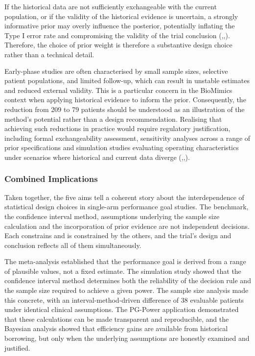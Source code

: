 \documentclass{article}
\begin{document}
If the historical data are not sufficiently exchangeable with the
current population, or if the validity of the historical evidence is
uncertain, a strongly informative prior may overly influence the
posterior, potentially inflating the Type I error rate and compromising
the validity of the trial conclusion
(,,).
Therefore, the choice of prior weight is therefore a substantive design
choice rather than a technical detail.

Early-phase studies are often characterised by small sample sizes,
selective patient populations, and limited follow-up, which can result
in unstable estimates and reduced external validity. This is a
particular concern in the BioMimics context when applying historical
evidence to inform the prior. Consequently, the reduction from 209 to 79
patients should be understood as an illustration of the method's
potential rather than a design recommendation. Realising that achieving
such reductions in practice would require regulatory justification,
including formal exchangeability assessment, sensitivity analyses across
a range of prior specifications and simulation studies evaluating
operating characteristics under scenarios where historical and current
data diverge
(,,).

\subsubsection{Combined Implications}\label{combined-implications}

Taken together, the five aims tell a coherent story about the
interdependence of statistical design choices in single-arm performance
goal studies. The benchmark, the confidence interval method, assumptions
underlying the sample size calculation and the incorporation of prior
evidence are not independent decisions. Each constrains and is
constrained by the others, and the trial's design and conclusion
reflects all of them simultaneously.

The meta-analysis established that the performance goal is derived from
a range of plausible values, not a fixed estimate. The simulation study
showed that the confidence interval method determines both the
reliability of the decision rule and the sample size required to achieve
a given power. The sample size analysis made this concrete, with an
interval-method-driven difference of 38 evaluable patients under
identical clinical assumptions. The PG-Power application demonstrated
that these calculations can be made transparent and reproducible, and
the Bayesian analysis showed that efficiency gains are available from
historical borrowing, but only when the underlying assumptions are
honestly examined and justified.
\end{document}
